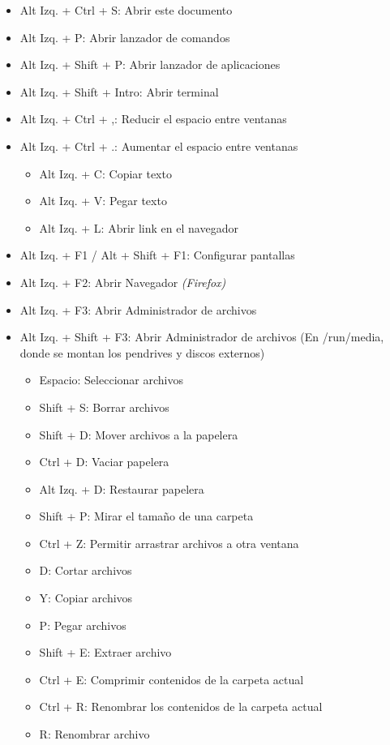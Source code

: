 \documentclass[12pt]{article}
\begin{document}
\begin{itemize}
\setlength\itemsep{-0.4em}
\item Alt Izq. + Ctrl + S: Abrir este documento
\item Alt Izq. + P: Abrir lanzador de comandos
\item Alt Izq. + Shift + P: Abrir lanzador de aplicaciones
\item Alt Izq. + Shift + Intro: Abrir terminal
\item Alt Izq. + Ctrl + ,: Reducir el espacio entre ventanas
\item Alt Izq. + Ctrl + .: Aumentar el espacio entre ventanas
\begin{itemize}
\setlength\itemsep{-0.3em}
\item Alt Izq. + C: Copiar texto
\item Alt Izq. + V: Pegar texto
\item Alt Izq. + L: Abrir link en el navegador
\end{itemize}
\item Alt Izq. + F1 / Alt + Shift + F1: Configurar pantallas
\item Alt Izq. + F2: Abrir Navegador \emph{(Firefox)}
\item Alt Izq. + F3: Abrir Administrador de archivos
\item Alt Izq. + Shift + F3: Abrir Administrador de archivos (En /run/media, donde se montan los pendrives y discos externos)
\begin{itemize}
\setlength\itemsep{-0.3em}
\item Espacio: Seleccionar archivos
\item Shift + S: Borrar archivos
\item Shift + D: Mover archivos a la papelera
\item Ctrl + D: Vaciar papelera
\item Alt Izq. + D: Restaurar papelera
\item Shift + P: Mirar el tamaño de una carpeta
\item Ctrl + Z: Permitir arrastrar archivos a otra ventana
\item D: Cortar archivos
\item Y: Copiar archivos
\item P: Pegar archivos
\item Shift + E: Extraer archivo
\item Ctrl + E: Comprimir contenidos de la carpeta actual
\item Ctrl + R: Renombrar los contenidos de la carpeta actual
\item R: Renombrar archivo

\end{itemize}
\end{itemize}
\end{document}
